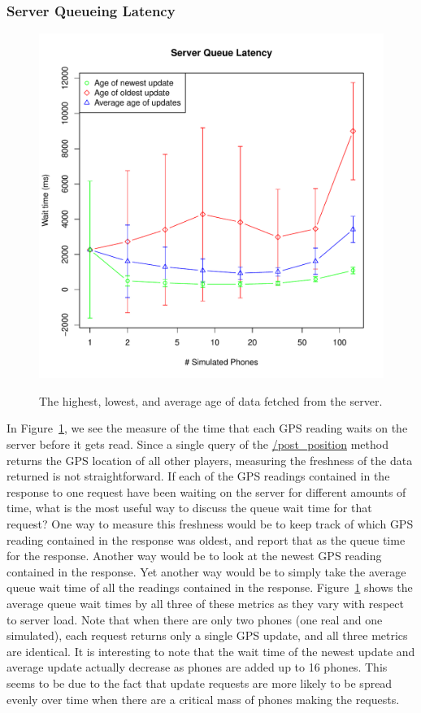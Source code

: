 \documentclass{acm_proc_article-sp}
\begin{document}
\subsubsection{Server Queueing Latency}
\begin{figure}
\centering
\includegraphics[scale=0.5]{figs/serverQueueLatency}
\label{fig:serverQueueLatency}
\caption{The highest, lowest, and average age of data fetched from the server.}
\end{figure}

In Figure~\ref{fig:serverQueueLatency}, we see the measure of the time that each GPS reading waits on the server before it gets read.  Since a single query of the \url{/post_position} method returns the GPS location of all other players, measuring the freshness of the data returned is not straightforward. If each of the GPS readings contained in the response to one request have been waiting on the server for different amounts of time, what is the most useful way to discuss the queue wait time for that request?
One way to measure this freshness would be to keep track of which GPS reading contained in the response was oldest, and report that as the queue time for the response. Another way would be to look at the newest GPS reading contained in the response. Yet another way would be to simply take the average queue wait time of all the readings contained in the response.
Figure~\ref{fig:serverQueueLatency} shows the average queue wait times by all three of these metrics as they vary with respect to server load.
Note that when there are only two phones (one real and one simulated), each request returns only a single GPS update, and all three metrics are identical.
It is interesting to note that the wait time of the newest update and average update actually decrease as phones are added up to 16 phones. This seems to be due to the fact that update requests are more likely to be spread evenly over time when there are a critical mass of phones making the requests.
\end{document}
